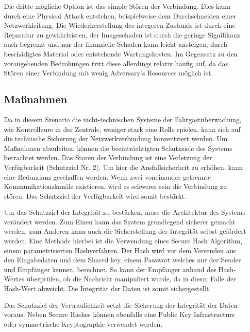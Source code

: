 Die dritte mögliche Option ist das simple Stören der Verbindung. Dies kann durch eine \glqq{}Physical Attack\grqq{} entstehen, beispielweise dem Durchschneiden einer Netzwerkleitung. Die Wiederherstellung des
integeren Zustands ist durch eine Reparatur zu gewährleisten, der Imageschaden ist durch die geringe Signifikanz auch begrenzt und nur der finanzielle Schaden kann leicht ansteigen, durch beschädigtes Material
oder entstehende Wartungskosten. Im Gegensatz zu den vorangehenden Bedrohungen tritt diese allerdings relativ häufig auf, da das Stören einer Verbindung mit wenig \glqq{}Adversary's Resources\grqq{} möglich ist.

\subsection{Maßnahmen}
Da in diesem Szenario die nicht-technischen Systeme der Fahrgastüberwachung, wie Kontrolleure in der Zentrale, weniger stark eine Rolle spielen, kann sich auf die technische Sicherung der Netzwerkverbindung konzentriert werden.
Um Maßnahmen abzuleiten, können die beeinträchtigten Schutzziele des Systems betrachtet werden. Das Stören der Verbindung ist eine Verletzung der Verfügbarkeit (Schutzziel Nr. 2). Um hier die Ausfallsicherheit
zu erhöhen, kann eine Redundanz geschaffen werden. Wenn zwei voneinander getrennte Kommunikationskanäle existieren, wird es schwerer sein
die Verbindung zu stören. Das Schutzziel der Verfügbarkeit wird somit bestärkt.

Um das Schutzziel der Integrität zu bestärken, muss die Architektur des Systems verändert werden. Zum Einen kann das System grundlegend sicherer gemacht werden, zum Anderen kann auch
die Sicherstellung der Integrität selbst gefördert werden. Eine Methode hierbei ist die Verwendung eines \glqq{}Secure Hash Algorithm\grqq{}, einem parametrisierten Hashverfahren.
Der Hash wird vor dem Versenden aus den Eingabedaten und dem Shared key, einem Passwort welches nur der Sender und Empfänger kennen, berechnet. So kann der Empfänger anhand des Hash-Wertes überprüfen,
ob die Nachricht manipuliert wurde, da in diesm Falle der Hash-Wert abweicht. Die Integrität der Daten ist somit sichergestellt.

Das Schutzziel der Vertraulichkeit setzt die Sicherung der Integrität der Daten voraus. Neben Secure Hashes können ebenfalls eine \glqq{}Public Key Infrastructure\grqq{} oder symmetrische Kryptographie verwendet werden.
